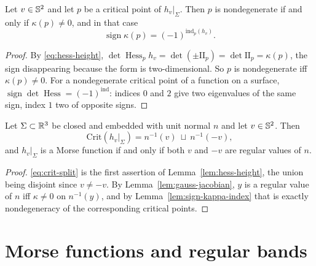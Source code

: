 \begin{lemma}
\label{lem:sign-kappa-index}
Let $v\in\mathbb S^2$ and let $p$ be a critical point of $h_v|_\Sigma$.  Then $p$
is nondegenerate if and only if $\kappa(p)\ne0$, and in that case
\begin{equation}\label{eq:sign-kappa-index}
  \operatorname{sign}\kappa(p)=(-1)^{\mathrm{ind}_p(h_v)} .
\end{equation}
\end{lemma}

\begin{proof}
By \eqref{eq:hess-height},
$\det\operatorname{Hess}_ph_v=\det(\pm\mathrm{II}_p)=\det\mathrm{II}_p=\kappa(p)$,
the sign disappearing because the form is two-dimensional.  So $p$ is
nondegenerate iff $\kappa(p)\ne0$.  For a nondegenerate critical point of a
function on a surface, $\operatorname{sign}\det\operatorname{Hess}
=(-1)^{\mathrm{ind}}$: indices $0$ and $2$ give two eigenvalues of the same
sign, index $1$ two of opposite signs.
\end{proof}

\begin{lemma}\label{lem:critical-normal}
Let $\Sigma\subset\mathbb R^3$ be closed and embedded with unit normal $n$ and let
$v\in\mathbb S^2$.  Then
\begin{equation}\label{eq:crit-split}
  \mathrm{Crit}(h_v|_\Sigma)=n^{-1}(v)\ \sqcup\ n^{-1}(-v),
\end{equation}
and $h_v|_\Sigma$ is a Morse function if and only if both $v$ and $-v$ are
regular values of $n$.
\end{lemma}

\begin{proof}
\eqref{eq:crit-split} is the first assertion of
Lemma~\ref{lem:hess-height}, the union being disjoint since $v\ne-v$.  By
Lemma~\ref{lem:gauss-jacobian}, $y$ is a regular value of $n$ iff
$\kappa\ne0$ on $n^{-1}(y)$, and by
Lemma~\ref{lem:sign-kappa-index} that is exactly nondegeneracy of the
corresponding critical points.
\end{proof}

\section{Morse functions and regular bands}\label{sec:morse}

